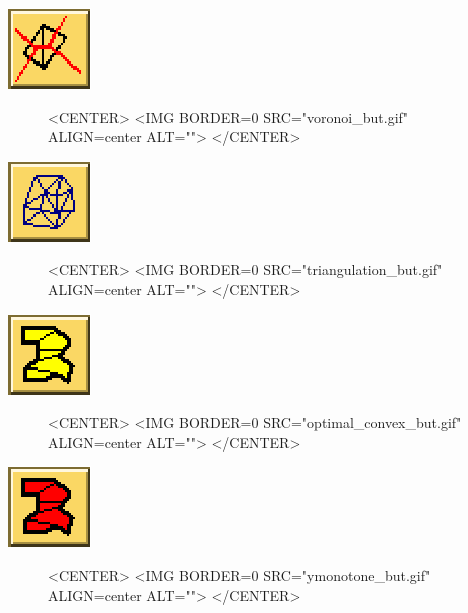 \begin{ccTexOnly}
\mbox{\includegraphics{voronoi_but.eps}}
\end{ccTexOnly}
\begin{figure}
\begin{ccHtmlOnly}
<CENTER>
<IMG BORDER=0 SRC="voronoi_but.gif"  ALIGN=center  ALT="">
</CENTER>
\end{ccHtmlOnly}
\end{figure}

\begin{ccTexOnly}
\mbox{\includegraphics{triangulation_but.eps}}
\end{ccTexOnly}
\begin{figure}
\begin{ccHtmlOnly}
<CENTER>
<IMG BORDER=0 SRC="triangulation_but.gif"  ALIGN=center  ALT="">
</CENTER>
\end{ccHtmlOnly}
\end{figure}

\begin{ccTexOnly}
\mbox{\includegraphics{optimal_convex_but.eps}}
\end{ccTexOnly}
\begin{figure}
\begin{ccHtmlOnly}
<CENTER>
<IMG BORDER=0 SRC="optimal_convex_but.gif"  ALIGN=center  ALT="">
</CENTER>
\end{ccHtmlOnly}
\end{figure}

\begin{ccTexOnly}
\mbox{\includegraphics{ymonotone_but.eps}}
\end{ccTexOnly}
\begin{figure}
\begin{ccHtmlOnly}
<CENTER>
<IMG BORDER=0 SRC="ymonotone_but.gif"  ALIGN=center  ALT="">
</CENTER>
\end{ccHtmlOnly}
\end{figure}

